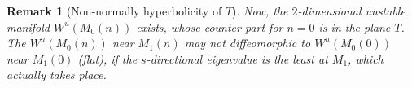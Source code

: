 \documentclass[a4paper,11pt]{article}
\newtheorem{theorem}{Theorem}
\newtheorem{remark}{Remark}[section]
\begin{document}
\begin{remark}[Non-normally hyperbolicity of $T$]
 Now, the $2$-dimensional unstable manifold $W^u(M_0(n))$ exists, whose counter part for $n=0$  is in the plane $T$. The $W^u(M_0(n))$ near $M_1(n)$ may not diffeomorphic to $W^u(M_0(0))$ near $M_1(0)$ (flat), if the $s$-directional eigenvalue is the least at $M_1$, which actually takes place.
\end{remark}



% 
% 
% 
\end{document}
